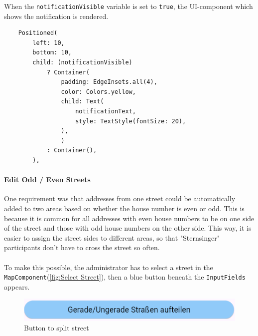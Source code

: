 When the \texttt{notificationVisible} variable is set to \texttt{true}, the UI-component which shows the notification is rendered.
\lstset{style=mycsharp, caption=Notification in AddressPage}
\begin{lstlisting}
    Positioned(
        left: 10,
        bottom: 10,
        child: (notificationVisible)
            ? Container(
                padding: EdgeInsets.all(4),
                color: Colors.yellow,
                child: Text(
                    notificationText,
                    style: TextStyle(fontSize: 20),
                ),
                )
            : Container(),
        ),
\end{lstlisting}



\paragraph{Edit Odd / Even Streets}
One requirement was that addresses from one street could be automatically added to two areas based on whether the house number is even or odd. This is because it is common for all addresses with even house numbers to be on one side of the street and those with odd house numbers on the other side. This way, it is easier to assign the street sides to different areas, so that "Sternsinger" participants don't have to cross the street so often.\\\\
To make this possible, the administrator has to select a street in the \texttt{MapComponent}(\ref{fig:Select Street}), then a blue button beneath the \texttt{InputFields} appears. \\

\begin{figure}[H]
    \centering
    \includegraphics[width=0.7\linewidth]{images/AdminPanel/splitStreetButton.png}
    \caption{Button to split street}
\end{figure}

